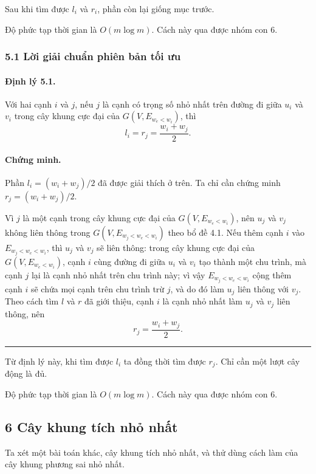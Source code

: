 \documentclass[11pt]{article}
\newcommand{\qedmark}{\hfill\rule{0.7ex}{0.7ex}}
\begin{document}
Sau khi tìm được \(l_i\) và \(r_i\), phần còn lại giống mục trước.

Độ phức tạp thời gian là \(O(m\log m)\). Cách này qua được nhóm con 6.

\subsubsection*{5.1 Lời giải chuẩn phiên bản tối ưu}

\paragraph{Định lý 5.1.}
Với hai cạnh \(i\) và \(j\), nếu \(j\) là cạnh có trọng số nhỏ nhất trên đường
đi giữa \(u_i\) và \(v_i\) trong cây khung cực đại của \(G(V,E_{w_e<w_i})\), thì
\[
  l_i=r_j=\frac{w_i+w_j}{2}.
\]

\paragraph{Chứng minh.}
Phần \(l_i=(w_i+w_j)/2\) đã được giải thích ở trên. Ta chỉ cần chứng minh
\(r_j=(w_i+w_j)/2\).

Vì \(j\) là một cạnh trong cây khung cực đại của \(G(V,E_{w_e<w_i})\), nên
\(u_j\) và \(v_j\) không liên thông trong \(G(V,E_{w_j<w_e<w_i})\) theo bổ đề
4.1. Nếu thêm cạnh \(i\) vào \(E_{w_j<w_e<w_i}\), thì \(u_j\) và \(v_j\) sẽ liên
thông: trong cây khung cực đại của \(G(V,E_{w_e<w_i})\), cạnh \(i\) cùng đường
đi giữa \(u_i\) và \(v_i\) tạo thành một chu trình, mà cạnh \(j\) lại là cạnh
nhỏ nhất trên chu trình này; vì vậy \(E_{w_j<w_e<w_i}\) cộng thêm cạnh \(i\) sẽ
chứa mọi cạnh trên chu trình trừ \(j\), và do đó làm \(u_j\) liên thông với
\(v_j\). Theo cách tìm \(l\) và \(r\) đã giới thiệu, cạnh \(i\) là cạnh nhỏ nhất
làm \(u_j\) và \(v_j\) liên thông, nên
\[
  r_j=\frac{w_i+w_j}{2}.
\]
\qedmark

Từ định lý này, khi tìm được \(l_i\) ta đồng thời tìm được \(r_j\). Chỉ cần một
lượt cây động là đủ.

Độ phức tạp thời gian là \(O(m\log m)\). Cách này qua được nhóm con 6.

\subsection*{6 Cây khung tích nhỏ nhất}

Ta xét một bài toán khác, cây khung tích nhỏ nhất, và thử dùng cách làm của cây
khung phương sai nhỏ nhất.
\end{document}
